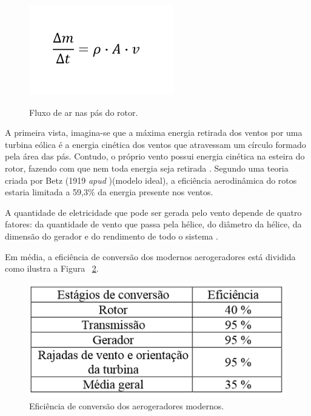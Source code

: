     \begin{figure}[h]
      \begin{center}
	\includegraphics[scale=0.65]{editaveis/figuras/formula_terciote}
	\label{fluxo_ar_pa}
	\caption[Fluxo de ar nas pás do rotor]{Fluxo de ar nas pás do rotor. \footnotemark}
      \end{center}
    \end{figure}
    \FloatBarrier
    
    A primeira vista, imagina-se que a máxima energia retirada dos ventos por uma turbina eólica é a energia cinética dos
    ventos que atravessam um círculo formado pela área das pás. Contudo, o próprio vento possui energia cinética na esteira
    do rotor, fazendo com que nem toda energia seja retirada \cite{terciote02}. Segundo uma teoria criada
    por Betz (1919 \textit{apud} \cite{terciote02})(modelo ideal), a eficiência aerodinâmica do rotos estaria
    limitada a 59,3\% da energia presente nos ventos.
    
    A quantidade de eletricidade que pode ser gerada pelo vento depende de quatro fatores: da quantidade de vento que passa
    pela hélice, do diâmetro da hélice, da dimensão do gerador e do rendimento de todo o sistema \cite{amaral12}.
    
    Em média, a eficiência de conversão dos modernos aerogeradores está dividida
    como ilustra a Figura ~\ref{eficiencia_conversao_aerogeradores}.
    
    \begin{figure}[!ht]
    \centering
    \includegraphics[scale=0.7]{editaveis/figuras/eficiencia_conversao_aerogeradores}
    \caption[Eficiência de conversão dos aerogeradores modernos]{Eficiência de conversão dos aerogeradores modernos. \footnotemark}
    \label{eficiencia_conversao_aerogeradores}
    \end{figure}
    

